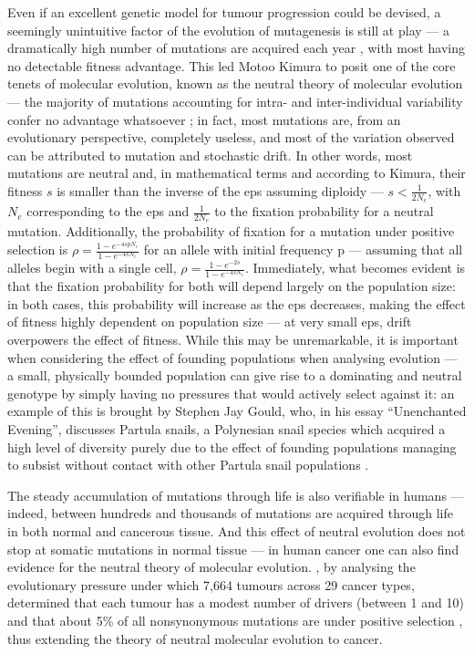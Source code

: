 Even if an excellent genetic model for tumour progression could be devised, a seemingly unintuitive factor of the evolution of mutagenesis is still at play --- a dramatically high number of mutations are acquired each year \cite{Kimura1968-xd}, with most having no detectable fitness advantage. This led Motoo Kimura to posit one of the core tenets of molecular evolution, known as the neutral theory of molecular evolution --- the majority of mutations accounting for intra- and inter-individual variability confer no advantage whatsoever \cite{Kimura1979-ps}; in fact, most mutations are, from an evolutionary perspective, completely useless, and most of the variation observed can be attributed to mutation and stochastic drift. In other words, most mutations are neutral and, in mathematical terms and according to Kimura, their fitness $s$ is smaller than the inverse of the \ac{eps} assuming diploidy --- $s<\frac{1}{2N_e}$, with $N_e$ corresponding to the \ac{eps} and $\frac{1}{2N_e}$ to the fixation probability for a neutral mutation. Additionally, the probability of fixation for a mutation under positive selection is $\rho = \frac{1-e^{-4spN_e}}{1-e^{-4sN_e}}$ for an allele with initial frequency p \cite{Kimura1962-df} --- assuming that all alleles begin with a single cell, $\rho = \frac{1-e^{-2s}}{1-e^{-4sN_e}}$. Immediately, what becomes evident is that the fixation probability for both will depend largely on the population size: in both cases, this probability will increase as the \ac{eps} decreases, making the effect of fitness highly dependent on population size --- at very small \ac{eps}, drift overpowers the effect of fitness. While this may be unremarkable, it is important when considering the effect of founding populations when analysing evolution --- a small, physically bounded population can give rise to a dominating and neutral genotype by simply having no pressures that would actively select against it: an example of this is brought by Stephen Jay Gould, who, in his essay “Unenchanted Evening”, discusses Partula snails, a Polynesian snail species which acquired a high level of diversity purely due to the effect of founding populations managing to subsist without contact with other Partula snail populations \cite{Gould1995-yr}.

The steady accumulation of mutations through life is also verifiable in humans \cite{Lee-Six2018-lp,Williams2020-ji,Yoshida2020-zi} --- indeed, between hundreds and thousands of mutations are acquired through life in both normal and cancerous tissue. And this effect of neutral evolution does not stop at somatic mutations in normal tissue --- in human cancer one can also find evidence for the neutral theory of molecular evolution. , by analysing the evolutionary pressure under which 7,664 tumours across 29 cancer types, determined that each tumour has a modest number of drivers (between 1 and 10) and that about 5\% of all nonsynonymous mutations are under positive selection \cite{Martincorena2017-ii}, thus extending the theory of neutral molecular evolution to cancer. 

